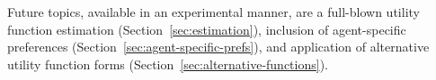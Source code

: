 Future topics, available in an experimental manner, are a full-blown utility function estimation (Section~\ref{sec:estimation}), inclusion of agent-specific preferences (Section~\ref{sec:agent-specific-prefs}), and application of alternative utility function forms (Section~\ref{sec:alternative-functions}).

%
%
%
%
%
%
%
%
%
%
%
%
%
%
%
%
%
